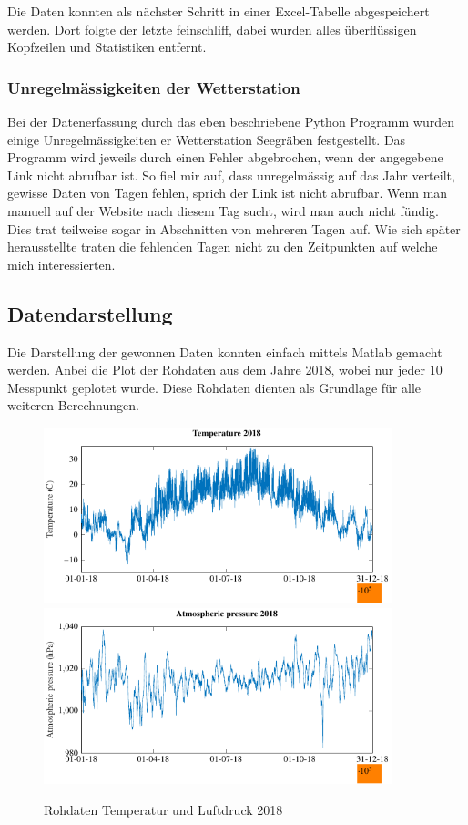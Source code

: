 \begin{refsection}
Die Daten konnten als nächster Schritt in einer Excel-Tabelle abgespeichert werden.
Dort folgte der letzte feinschliff, dabei wurden alles überflüssigen Kopfzeilen und Statistiken entfernt.

\subsubsection{Unregelmässigkeiten der Wetterstation}
Bei der Datenerfassung durch das eben beschriebene Python Programm wurden einige Unregelmässigkeiten er Wetterstation Seegräben festgestellt.
Das Programm wird jeweils durch einen Fehler abgebrochen, wenn der angegebene Link nicht abrufbar ist. 
So fiel mir auf, dass unregelmässig auf das Jahr verteilt, gewisse Daten von Tagen fehlen, sprich der Link ist nicht abrufbar.
Wenn man manuell auf der Website nach diesem Tag sucht, wird man auch nicht fündig.
Dies trat teilweise sogar in Abschnitten von mehreren Tagen auf.
Wie sich später herausstellte traten die fehlenden Tagen nicht zu den Zeitpunkten auf welche mich interessierten.
\newpage

\subsection{Datendarstellung}
Die Darstellung der gewonnen Daten konnten einfach mittels Matlab gemacht werden. Anbei die Plot der Rohdaten aus dem Jahre 2018, wobei nur jeder 10 Messpunkt geplotet wurde. Diese Rohdaten dienten als Grundlage für alle weiteren Berechnungen. 

\begin{figure}[h]
\centering
\includegraphics[width=0.9\textwidth]{papers/wwt/images/raw_temp_wwt.pdf}
\includegraphics[width=0.9\textwidth]{papers/wwt/images/raw_airp_wwt.pdf}
\caption{Rohdaten Temperatur und Luftdruck 2018}
\end{figure}



\end{refsection}
